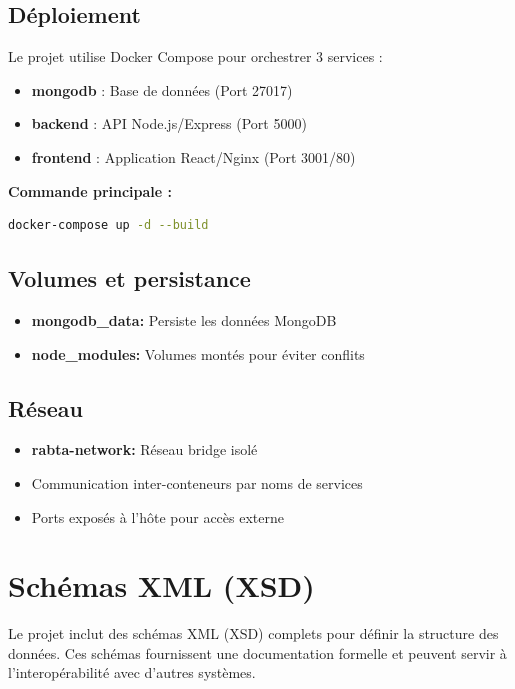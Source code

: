 \documentclass[12pt,a4paper]{article}
\begin{document}
\subsection{Déploiement}

Le projet utilise Docker Compose pour orchestrer 3 services :
\begin{itemize}
    \item \textbf{mongodb} : Base de données (Port 27017)
    \item \textbf{backend} : API Node.js/Express (Port 5000)
    \item \textbf{frontend} : Application React/Nginx (Port 3001/80)
\end{itemize}

\textbf{Commande principale :}
\begin{lstlisting}[language=bash]
docker-compose up -d --build
\end{lstlisting}

\subsection{Volumes et persistance}

\begin{itemize}
    \item \textbf{mongodb\_data:} Persiste les données MongoDB
    \item \textbf{node\_modules:} Volumes montés pour éviter conflits
\end{itemize}

\subsection{Réseau}

\begin{itemize}
    \item \textbf{rabta-network:} Réseau bridge isolé
    \item Communication inter-conteneurs par noms de services
    \item Ports exposés à l'hôte pour accès externe
\end{itemize}

\section{Schémas XML (XSD)}

Le projet inclut des schémas XML (XSD) complets pour définir la structure des données. Ces schémas fournissent une documentation formelle et peuvent servir à l'interopérabilité avec d'autres systèmes.
\end{document}
